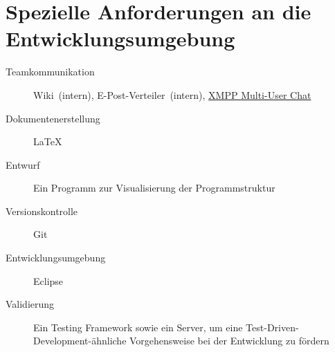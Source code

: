 \section{Spezielle Anforderungen an die Entwicklungsumgebung}%

\begin{description}%
    \item [Teamkommunikation] Wiki~(intern), E-Post-Verteiler~(intern), \href{http://xmpp.org/extensions/xep-0045.html}{XMPP Multi-User Chat}
    \item [Dokumentenerstellung] \LaTeX{}%
    \item [Entwurf] Ein Programm zur Visualisierung der Programmstruktur
    \item [Versionskontrolle] Git%
    \item [Entwicklungsumgebung] Eclipse%
    \item [Validierung] Ein Testing Framework sowie ein  Server, um eine Test-Driven-Development-ähnliche Vorgehensweise bei der Entwicklung zu fördern
\end{description}%
